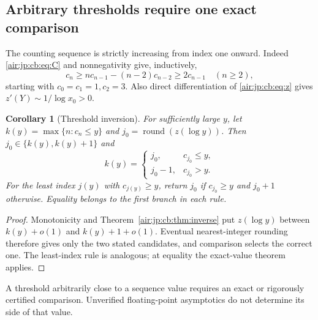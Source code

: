 \documentclass[11pt,letterpaper]{article}
\numberwithin{equation}{section}
\newtheorem{corollary}[theorem]{Corollary}
\theoremstyle{remark}
\begin{document}
\subsection{Arbitrary thresholds require one exact comparison}
The counting sequence is strictly increasing from index one onward. Indeed \eqref{air:jp:cb:eq:C} and nonnegativity give, inductively,
\[
 c_n\ge nc_{n-1}-(n-2)c_{n-2}\ge2c_{n-1}\quad(n\ge2),
\]
starting with $c_0=c_1=1,c_2=3$. Also direct differentiation of \eqref{air:jp:cb:eq:z} gives $z'(Y)\sim1/\log x_0>0$.
\begin{corollary}[Threshold inversion]\label{air:jp:cb:cor:threshold}
For sufficiently large $y$, let $k(y)=\max\{n:c_n\le y\}$ and $j_0=\operatorname{round}(z(\log y))$. Then $j_0\in\{k(y),k(y)+1\}$ and
\[
 k(y)=\begin{cases}j_0,&c_{j_0}\le y,\\j_0-1,&c_{j_0}>y.\end{cases}
\]
For the least index $j(y)$ with $c_{j(y)}\ge y$, return $j_0$ if $c_{j_0}\ge y$ and $j_0+1$ otherwise. Equality belongs to the first branch in each rule.
\end{corollary}
\begin{proof}
Monotonicity and Theorem~\ref{air:jp:cb:thm:inverse} put $z(\log y)$ between $k(y)+o(1)$ and $k(y)+1+o(1)$. Eventual nearest-integer rounding therefore gives only the two stated candidates, and comparison selects the correct one. The least-index rule is analogous; at equality the exact-value theorem applies.
\end{proof}
A threshold arbitrarily close to a sequence value requires an exact or rigorously certified comparison. Unverified floating-point asymptotics do not determine its side of that value.
\end{document}
